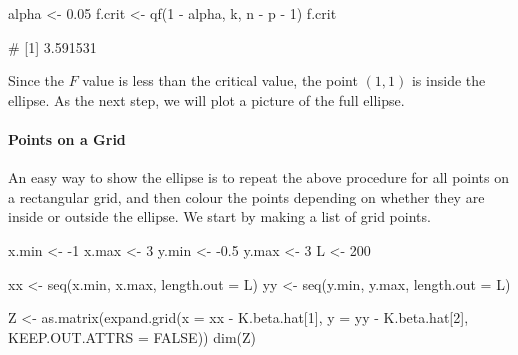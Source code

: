 \documentclass[
  a4paper,
]{article}
\newenvironment{Shaded}{\begin{snugshade}}{\end{snugshade}}
\newcommand{\AttributeTok}[1]{\textcolor[rgb]{0.77,0.63,0.00}{#1}}
\newcommand{\ConstantTok}[1]{\textcolor[rgb]{0.00,0.00,0.00}{#1}}
\newcommand{\DecValTok}[1]{\textcolor[rgb]{0.00,0.00,0.81}{#1}}
\newcommand{\FloatTok}[1]{\textcolor[rgb]{0.00,0.00,0.81}{#1}}
\newcommand{\FunctionTok}[1]{\textcolor[rgb]{0.00,0.00,0.00}{#1}}
\newcommand{\NormalTok}[1]{#1}
\newcommand{\OtherTok}[1]{\textcolor[rgb]{0.56,0.35,0.01}{#1}}
\newcommand{\SpecialCharTok}[1]{\textcolor[rgb]{0.00,0.00,0.00}{#1}}
\theoremstyle{definition}
\theoremstyle{definition}
\theoremstyle{definition}
\theoremstyle{definition}
\theoremstyle{remark}
\begin{document}
\begin{Shaded}
\begin{Highlighting}[]
\NormalTok{alpha }\OtherTok{\textless{}{-}} \FloatTok{0.05}
\NormalTok{f.crit }\OtherTok{\textless{}{-}} \FunctionTok{qf}\NormalTok{(}\DecValTok{1} \SpecialCharTok{{-}}\NormalTok{ alpha, k, n }\SpecialCharTok{{-}}\NormalTok{ p }\SpecialCharTok{{-}} \DecValTok{1}\NormalTok{)}
\NormalTok{f.crit}
\end{Highlighting}
\end{Shaded}

\begin{Shaded}
\begin{Highlighting}[]
\NormalTok{\# [1] 3.591531}
\end{Highlighting}
\end{Shaded}

Since the \(F\) value is less than the critical value, the point \((1, 1)\)
is inside the ellipse. As the next step, we will plot a picture of the
full ellipse.

\hypertarget{points-on-a-grid}{%
\paragraph{Points on a Grid}\label{points-on-a-grid}}

An easy way to show the ellipse is to repeat the above procedure for
all points on a rectangular grid, and then colour the points
depending on whether they are inside or outside the ellipse.
We start by making a list of grid points.

\begin{Shaded}
\begin{Highlighting}[]
\NormalTok{x.min }\OtherTok{\textless{}{-}} \SpecialCharTok{{-}}\DecValTok{1}
\NormalTok{x.max }\OtherTok{\textless{}{-}} \DecValTok{3}
\NormalTok{y.min }\OtherTok{\textless{}{-}} \SpecialCharTok{{-}}\FloatTok{0.5}
\NormalTok{y.max }\OtherTok{\textless{}{-}} \DecValTok{3}
\NormalTok{L }\OtherTok{\textless{}{-}} \DecValTok{200}

\NormalTok{xx }\OtherTok{\textless{}{-}} \FunctionTok{seq}\NormalTok{(x.min, x.max, }\AttributeTok{length.out =}\NormalTok{ L)}
\NormalTok{yy }\OtherTok{\textless{}{-}} \FunctionTok{seq}\NormalTok{(y.min, y.max, }\AttributeTok{length.out =}\NormalTok{ L)}

\NormalTok{Z }\OtherTok{\textless{}{-}} \FunctionTok{as.matrix}\NormalTok{(}\FunctionTok{expand.grid}\NormalTok{(}\AttributeTok{x =}\NormalTok{ xx }\SpecialCharTok{{-}}\NormalTok{ K.beta.hat[}\DecValTok{1}\NormalTok{],}
                           \AttributeTok{y =}\NormalTok{ yy }\SpecialCharTok{{-}}\NormalTok{ K.beta.hat[}\DecValTok{2}\NormalTok{],}
                           \AttributeTok{KEEP.OUT.ATTRS =} \ConstantTok{FALSE}\NormalTok{))}
\FunctionTok{dim}\NormalTok{(Z)}
\end{Highlighting}
\end{Shaded}
\end{document}
